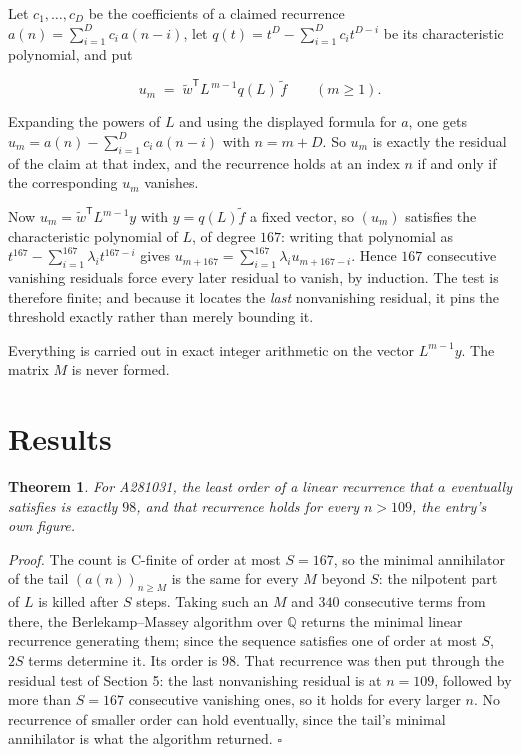 \documentclass[11pt]{article}
\newtheorem{theorem}{Theorem}
\theoremstyle{definition}
\begin{document}
Let $c_1,\dots,c_D$ be the coefficients of a claimed recurrence $a(n) = \sum_{i=1}^{D} c_i\,a(n-i)$, let $q(t) = t^{D} - \sum_{i=1}^{D} c_i t^{D-i}$ be its characteristic polynomial, and put

\[u_m \;=\; \tilde w^{\mathsf T} L^{\,m-1} q(L)\,\tilde f \qquad (m \ge 1).\]

Expanding the powers of $L$ and using the displayed formula for $a$, one gets $u_m = a(n) - \sum_{i=1}^{D} c_i\,a(n-i)$ with $n = m + D$. So $u_m$ is exactly the residual of the claim at that index, and the recurrence holds at an index $n$ if and only if the corresponding $u_m$ vanishes.

Now $u_m = \tilde w^{\mathsf T} L^{m-1} y$ with $y = q(L)\tilde f$ a fixed vector, so $(u_m)$ satisfies the characteristic polynomial of $L$, of degree $167$: writing that polynomial as $t^{167} - \sum_{i=1}^{167} \lambda_i t^{167-i}$ gives $u_{m+167} = \sum_{i=1}^{167} \lambda_i u_{m+167-i}$. Hence $167$ consecutive vanishing residuals force every later residual to vanish, by induction. The test is therefore finite; and because it locates the {\itshape last} nonvanishing residual, it pins the threshold exactly rather than merely bounding it.

Everything is carried out in exact integer arithmetic on the vector $L^{m-1}y$. The matrix $M$ is never formed.

\section{Results}

\begin{theorem} For A281031, the least order of a linear recurrence that $a$ eventually satisfies is exactly $98$, and that recurrence holds for every $n > 109$, the entry's own figure.\end{theorem}

{\itshape Proof.} The count is C-finite of order at most $S = 167$, so the minimal annihilator of the tail $(a(n))_{n \ge M}$ is the same for every $M$ beyond $S$: the nilpotent part of $L$ is killed after $S$ steps. Taking such an $M$ and $340$ consecutive terms from there, the Berlekamp--Massey algorithm over $\mathbb{Q}$ returns the minimal linear recurrence generating them; since the sequence satisfies one of order at most $S$, $2S$ terms determine it. Its order is $98$. That recurrence was then put through the residual test of Section 5: the last nonvanishing residual is at $n = 109$, followed by more than $S = 167$ consecutive vanishing ones, so it holds for every larger $n$. No recurrence of smaller order can hold eventually, since the tail's minimal annihilator is what the algorithm returned. $\square$
\end{document}
